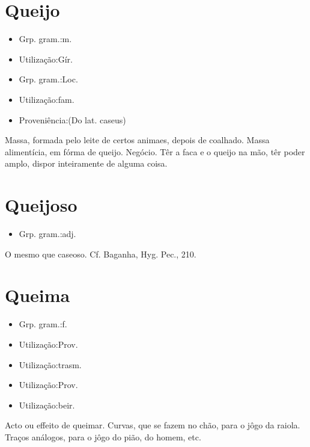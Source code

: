\section{Queijo}
\begin{itemize}
\item {Grp. gram.:m.}
\end{itemize}
\begin{itemize}
\item {Utilização:Gír.}
\end{itemize}
\begin{itemize}
\item {Grp. gram.:Loc.}
\end{itemize}
\begin{itemize}
\item {Utilização:fam.}
\end{itemize}
\begin{itemize}
\item {Proveniência:(Do lat. \textunderscore caseus\textunderscore )}
\end{itemize}
Massa, formada pelo leite de certos animaes, depois de coalhado.
Massa alimentícia, em fórma de queijo.
Negócio.
\textunderscore Têr a faca e o queijo na mão\textunderscore , têr poder amplo, dispor inteiramente de alguma coisa.
\section{Queijoso}
\begin{itemize}
\item {Grp. gram.:adj.}
\end{itemize}
O mesmo que \textunderscore caseoso\textunderscore . Cf. Baganha, \textunderscore Hyg. Pec.\textunderscore , 210.
\section{Queima}
\begin{itemize}
\item {Grp. gram.:f.}
\end{itemize}
\begin{itemize}
\item {Utilização:Prov.}
\end{itemize}
\begin{itemize}
\item {Utilização:trasm.}
\end{itemize}
\begin{itemize}
\item {Utilização:Prov.}
\end{itemize}
\begin{itemize}
\item {Utilização:beir.}
\end{itemize}
Acto ou effeito de queimar.
Curvas, que se fazem no chão, para o jôgo da raiola.
Traços análogos, para o jôgo do pião, do homem, etc.
